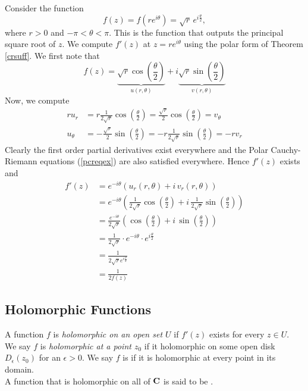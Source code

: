 \begin{example}
Consider the function
\[f(z) = f(re^{i\theta}) = \sqrt{r}\,e^{i\frac{\theta}{2}} ,\]
where $r > 0$ and $-\pi < \theta < \pi$. This is the function that outputs the principal square root of $z$. We compute $f'(z)$ at $z = re^{i\theta}$ using the polar form of Theorem \ref{crsuff}. We first note that
\[f(z) = \underbrace{\sqrt{r}\cos\left(\frac{\theta}{2}\right)}_{u(r,\theta)} + i\underbrace{\sqrt{r}\sin\left(\frac{\theta}{2}\right)}_{v(r,\theta)}\]
Now, we compute
\begin{align*}
ru_r &= r\frac{1}{2\sqrt{r}}\cos\left(\frac{\theta}{2}\right) = \frac{\sqrt{r}}{2}\cos\left(\frac{\theta}{2}\right) = v_\theta\\[0.5em]
u_\theta &= -\frac{\sqrt{r}}{2}\sin\left(\frac{\theta}{2}\right) = -r\frac{1}{2\sqrt{r}}\sin\left(\frac{\theta}{2}\right) = -rv_r
\end{align*}
Clearly the first order partial derivatives exist everywhere and the Polar Cauchy-Riemann equations (\ref{pcreqex}) are also satisfied everywhere. Hence $f'(z)$ exists and
\begin{align*}
f'(z) &= e^{-i\theta}(u_r(r,\theta) + i\,v_r(r,\theta))\\[0.5em]
&= e^{-i\theta}\left(\frac{1}{2\sqrt{r}}\cos\left(\frac{\theta}{2}\right) + i\,\frac{1}{2\sqrt{r}}\sin\left(\frac{\theta}{2}\right)\right)\\[0.5em]
&= \frac{e^{-i\theta}}{2\sqrt{r}}\left(\cos\left(\frac{\theta}{2}\right) + i\,\sin\left(\frac{\theta}{2}\right)\right)\\[0.5em]
&= \frac{1}{2\sqrt{r}}\cdot e^{-i\theta}\cdot e^{i\frac{\theta}{2}}\\[0.5em]
&= \frac{1}{2\sqrt{r}e^{i\frac{\theta}{2}}}\\[0.5em]
&= \frac{1}{2f(z)}
\end{align*}
\end{example}

\bigskip

\subsection{Holomorphic Functions}
%
\begin{definition}
A function $f$ is \emph{holomorphic on an open set $U$} if $f'(z)$ exists for every $z \in U$.\\[0.5em]
We say $f$ is \emph{holomorphic at a point $z_0$} if it holomorphic on some open disk $D_\epsilon(z_0)$ for an $\epsilon > 0$. We say $f$ is  if it is holomorphic at every point in its domain.\\[0.5em]
A function that is holomorphic on all of $\mathbf C$ is said to be . 
\end{definition}

